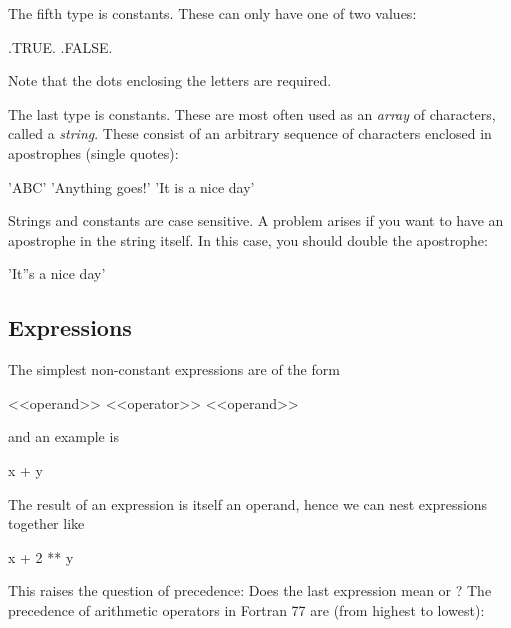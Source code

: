 The fifth type is  constants. These can only
have one of two values:

\begin{fortran77}
      .TRUE.
      .FALSE.
\end{fortran77}

Note that the dots enclosing the letters are required.

The last type is  constants. These are most
often used as an \textit{array} of characters, called a \textit{string}.
These consist of an arbitrary sequence of characters enclosed in
apostrophes (single quotes):

\begin{fortran77}
      'ABC'
      'Anything goes!'
      'It is a nice day'
\end{fortran77}

Strings and  constants are case sensitive. A
problem arises if you want to have an apostrophe in the string itself.
In this case, you should double the apostrophe:

\begin{fortran77}
      'It''s a nice day'
\end{fortran77}


\subsection*{Expressions}

The simplest non-constant expressions are of the form

\begin{fortran77}
      <<operand>> <<operator>> <<operand>>
\end{fortran77}

and an example is

\begin{fortran77}
      x + y
\end{fortran77}

The result of an expression is itself an operand, hence we can nest
expressions together like

\begin{fortran77}
      x + 2 ** y
\end{fortran77}

This raises the question of precedence: Does the last expression mean
 or ? The precedence
of arithmetic operators in Fortran 77 are (from highest to lowest):

